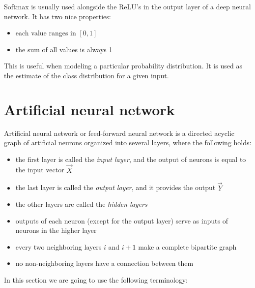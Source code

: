\noindent
Softmax is usually used alongside the ReLU's in the output layer of a deep neural network. It has two nice properties:

\begin{itemize}

\item each value ranges in $[0, 1]$
\item the sum of all values is always 1

\end{itemize}

This is useful when modeling a particular probability distribution. It is used as the estimate of the class distribution for a given input.

\section{Artificial neural network}

Artificial neural network or feed-forward neural network is a directed acyclic graph of artificial neurons organized into several layers, where the following holds:

\begin{itemize}

\item the first layer is called the \textit{input layer}, and the output of neurons is equal to the input vector $\overrightarrow{X}$

\item the last layer is called the \textit{output layer}, and it provides the output $\overrightarrow{Y}$

\item the other layers are called the \textit{hidden layers}

\item outputs of each neuron (except for the output layer) serve as inputs of neurons in the higher layer

\item every two neighboring layers $i$ and $i+1$ make a complete bipartite graph

\item no non-neighboring layers have a connection between them

\end{itemize}

\noindent
In this section we are going to use the following terminology:

